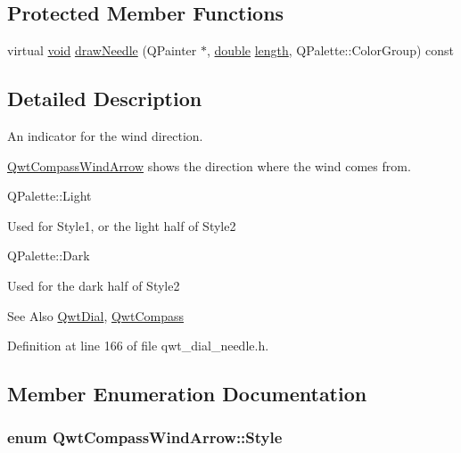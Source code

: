 \subsection*{Protected Member Functions}
\begin{DoxyCompactItemize}
\item 
virtual \hyperlink{group___u_a_v_objects_plugin_ga444cf2ff3f0ecbe028adce838d373f5c}{void} \hyperlink{class_qwt_compass_wind_arrow_a4e3b612f2de83ff416e34f62c1f0fd6c}{draw\-Needle} (Q\-Painter $\ast$, \hyperlink{_super_l_u_support_8h_a8956b2b9f49bf918deed98379d159ca7}{double} \hyperlink{glext_8h_a3c8469415bbc83dd1341af15c67f1cef}{length}, Q\-Palette\-::\-Color\-Group) const 
\end{DoxyCompactItemize}


\subsection{Detailed Description}
An indicator for the wind direction. 

\hyperlink{class_qwt_compass_wind_arrow}{Qwt\-Compass\-Wind\-Arrow} shows the direction where the wind comes from.


\begin{DoxyItemize}
\item Q\-Palette\-::\-Light\par
 Used for Style1, or the light half of Style2
\item Q\-Palette\-::\-Dark\par
 Used for the dark half of Style2
\end{DoxyItemize}

\begin{DoxySeeAlso}{See Also}
\hyperlink{class_qwt_dial}{Qwt\-Dial}, \hyperlink{class_qwt_compass}{Qwt\-Compass} 
\end{DoxySeeAlso}


Definition at line 166 of file qwt\-\_\-dial\-\_\-needle.\-h.



\subsection{Member Enumeration Documentation}
\hypertarget{class_qwt_compass_wind_arrow_a55f11e28c9d87c0fb7c306ccd174f2a8}{
\subsubsection[{Style}]{\setlength{\rightskip}{0pt plus 5cm}enum {\bf Qwt\-Compass\-Wind\-Arrow\-::\-Style}}}\label{class_qwt_compass_wind_arrow_a55f11e28c9d87c0fb7c306ccd174f2a8}


